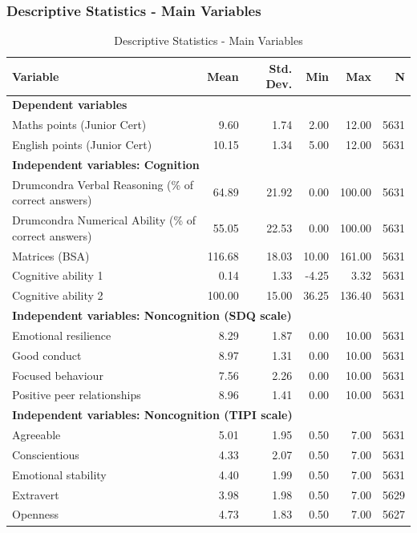 \documentclass{beamer}
\begin{document}
\begin{frame}
\frametitle{Descriptive Statistics - Main Variables}
\hypertarget{MainVariables}{}
\tiny
\begin{table}
\centering
\caption{Descriptive Statistics - Main Variables}
\label{tab:main_desc_stats}
\begin{tabular}{lrrrrr}
\toprule
Variable & Mean & Std. Dev. & Min & Max & N \\
\midrule
\multicolumn{6}{l}{\textbf{Dependent variables}} \\
Maths points (Junior Cert) & 9.60 & 1.74 & 2.00 & 12.00 & 5631 \\
English points (Junior Cert) & 10.15 & 1.34 & 5.00 & 12.00 & 5631 \\
\midrule
\multicolumn{6}{l}{\textbf{Independent variables: Cognition}} \\
Drumcondra Verbal Reasoning (\% of correct answers) & 64.89 & 21.92 & 0.00 & 100.00 & 5631 \\
Drumcondra Numerical Ability (\% of correct answers) & 55.05 & 22.53 & 0.00 & 100.00 & 5631 \\
Matrices (BSA) & 116.68 & 18.03 & 10.00 & 161.00 & 5631 \\
Cognitive ability 1 & 0.14 & 1.33 & -4.25 & 3.32 & 5631 \\
Cognitive ability 2 & 100.00 & 15.00 & 36.25 & 136.40 & 5631 \\
\midrule
\multicolumn{6}{l}{\textbf{Independent variables: Noncognition (SDQ scale)}} \\
Emotional resilience & 8.29 & 1.87 & 0.00 & 10.00 & 5631 \\
Good conduct & 8.97 & 1.31 & 0.00 & 10.00 & 5631 \\
Focused behaviour & 7.56 & 2.26 & 0.00 & 10.00 & 5631 \\
Positive peer relationships & 8.96 & 1.41 & 0.00 & 10.00 & 5631 \\
\midrule
\multicolumn{6}{l}{\textbf{Independent variables: Noncognition (TIPI scale)}} \\
Agreeable & 5.01 & 1.95 & 0.50 & 7.00 & 5631 \\
Conscientious & 4.33 & 2.07 & 0.50 & 7.00 & 5631 \\
Emotional stability & 4.40 & 1.99 & 0.50 & 7.00 & 5631 \\
Extravert & 3.98 & 1.98 & 0.50 & 7.00 & 5629 \\
Openness & 4.73 & 1.83 & 0.50 & 7.00 & 5627 \\
\bottomrule
\end{tabular}
\end{table}
\vfill
\hfill
\hyperlink{Timeline}{}
\end{frame}
\end{document}
